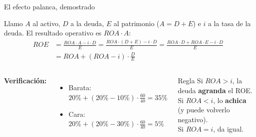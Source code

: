 \documentclass[aspectratio=169,10pt]{beamer}
\begin{document}
\begin{frame}{El efecto palanca, demostrado}

Llamo $A$ al activo, $D$ a la deuda, $E$ al patrimonio ($A = D + E$) e $i$ a la tasa de la deuda.
El resultado operativo es $ROA \cdot A$:
\[
\begin{aligned}
ROE &= \frac{ROA \cdot A - i \cdot D}{E}
     = \frac{ROA \cdot (D + E) - i \cdot D}{E}
     = \frac{ROA \cdot D + ROA \cdot E - i \cdot D}{E} \\[4pt]
    &= ROA + (ROA - i) \cdot \frac{D}{E}
\end{aligned}
\]

\begin{columns}[T]
\textbf{Verificación:}
\begin{itemize}
  \item Barata: $20\% + (20\% - 10\%) \cdot \tfrac{60}{40} = 35\%$
  \item Cara: $20\% + (20\% - 30\%) \cdot \tfrac{60}{40} = 5\%$
\end{itemize}

\begin{exampleblock}{Regla}
Si $ROA > i$, la deuda \textbf{agranda} el ROE. \\
Si $ROA < i$, lo \textbf{achica} (y puede volverlo negativo). \\
Si $ROA = i$, da igual.
\end{exampleblock}
\end{columns}
\end{frame}
\end{document}
